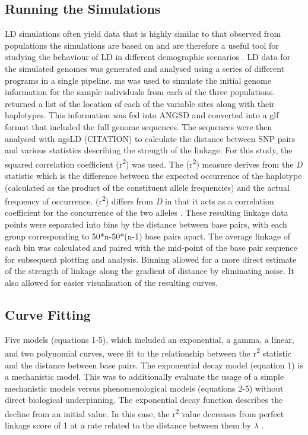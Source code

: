 \documentclass[11pt]{article}
\begin{document}
\begin{linenumbers}
\subsection{Running the Simulations}
LD simulations often yield data that is highly similar to that observed from populations the simulations are based on and are therefore a useful tool for studying the behaviour of LD in different demographic scenarios \citep{mcrae2005modeling}. LD data for the simulated genomes was generated and analysed using a series of different programs in a single pipeline. ms \citep{hudson2002generating} was used to simulate the initial genome information for the sample individuals from each of the three populations. \citep{hudson2002generating} returned a list of the location of each of the variable sites along with their haplotypes. This information was fed into ANGSD \citep{korneliussen_angsd:_2014} and converted into a glf format that included the full genome sequences. The sequences were then analysed with ngsLD (CITATION) to calculate the distance between SNP pairs and various statistics describing the strength of the linkage. For this study, the squared correlation coefficient (r\textsuperscript2) was used. The (r\textsuperscript2) measure derives from the \emph{D} statistic which is the difference between the expected occurrence of the haplotype (calculated as the product of the constituent allele frequencies) and the actual frequency of occurrence. (r\textsuperscript2) differs from \emph{D} in that it acts as a correlation coefficient for the concurrence of the two alleles \citep{slatkin2008linkage}. These resulting linkage data points were separated into bins by the distance between base pairs, with each group corresponding to 50*n-50*(n-1) base pairs apart. The average linkage of each bin was calculated and paired with the mid-point of the base pair sequence for subsequent plotting and analysis. Binning allowed for a more direct estimate of the strength of linkage along the gradient of distance by eliminating noise. It also allowed for easier visualisation of the resulting curves. 

\subsection{Curve Fitting}
Five models (equations 1-5), which included an exponential, a gamma, a linear, and two polynomial curves, were fit to the relationship between the r\textsuperscript2 statistic and the distance between base pairs. The exponential decay model (equation 1) is a mechanistic model. This was to additionally evaluate the usage of a simple mechanistic models versus phenomenological models (equations 2-5) without direct biological underpinning. The exponential decay function describes the decline from an initial value. In this case, the r\textsuperscript2 value decreases from perfect linkage score of 1 at a rate related to the distance between them by $\lambda$ . 


\end{linenumbers}
\end{document}
